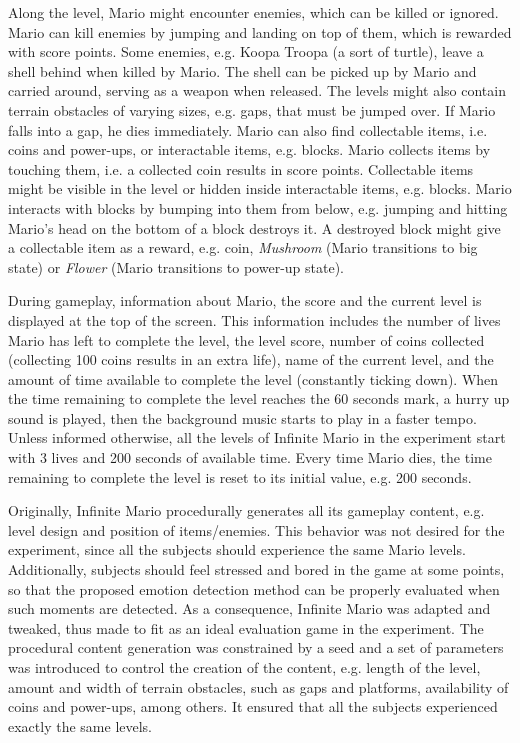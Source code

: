 Along the level, Mario might encounter enemies, which can be killed or ignored. Mario can kill enemies by jumping and landing on top of them, which is rewarded with score points. Some enemies, e.g. Koopa Troopa (a sort of turtle), leave a shell behind when killed by Mario. The shell can be picked up by Mario and carried around, serving as a weapon when released. The levels might also contain terrain obstacles of varying sizes, e.g. gaps, that must be jumped over. If Mario falls into a gap, he dies immediately. Mario can also find collectable items, i.e. coins and power-ups, or interactable items, e.g. blocks. Mario collects items by touching them, i.e. a collected coin results in score points. Collectable items might be visible in the level or hidden inside interactable items, e.g. blocks. Mario interacts with blocks by bumping into them from below, e.g. jumping and hitting Mario's head on the bottom of a block destroys it. A destroyed block might give a collectable item as a reward, e.g. coin, \textit{Mushroom} (Mario transitions to big state) or \textit{Flower} (Mario transitions to power-up state).

During gameplay, information about Mario, the score and the current level is displayed at the top of the screen. This information includes the number of lives Mario has left to complete the level, the level score, number of coins collected (collecting 100 coins results in an extra life), name of the current level, and the amount of time available to complete the level (constantly ticking down). When the time remaining to complete the level reaches the 60 seconds mark, a hurry up sound is played, then the background music starts to play in a faster tempo. Unless informed otherwise, all the levels of Infinite Mario in the experiment start with 3 lives and 200 seconds of available time. Every time Mario dies, the time remaining to complete the level is reset to its initial value, e.g. 200 seconds.

Originally, Infinite Mario procedurally generates all its gameplay content, e.g. level design and position of items/enemies. This behavior was not desired for the experiment, since all the subjects should experience the same Mario levels. Additionally, subjects should feel stressed and bored in the game at some points, so that the proposed emotion detection method can be properly evaluated when such moments are detected. As a consequence, Infinite Mario was adapted and tweaked, thus made to fit as an ideal evaluation game in the experiment. The procedural content generation was constrained by a seed and a set of parameters was introduced to control the creation of the content, e.g. length of the level, amount and width of terrain obstacles, such as gaps and platforms, availability of coins and power-ups, among others. It ensured that all the subjects experienced exactly the same levels.

